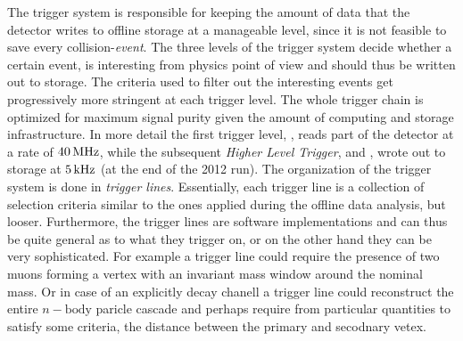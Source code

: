 
The trigger system is responsible for keeping the amount of data that the detector writes to offline storage
at a manageable level, since it is not feasible to save every collision-{\it event}. The three levels of
the \lhcb trigger system decide whether a certain event, is interesting from physics point
of view and should thus be written out to storage. The criteria used to filter out the interesting events 
get progressively more stringent at each trigger level. The whole trigger chain is optimized for maximum
signal purity given the amount of computing and storage infrastructure. In more detail the first trigger
level, \lzero, reads part of the detector at a rate of $40{\rm \,MHz}$, while the subsequent {\it Higher Level Trigger},
\hltone and \hlttwo, wrote out to storage at $5{\rm \,kHz}$ (at the end of the 2012 run). The organization of the trigger 
system is done in {\it trigger lines}. Essentially, each trigger line is a collection of selection criteria similar 
to the ones applied during the offline data analysis, but looser. Furthermore, the trigger lines are software
implementations and can thus be quite general as to what they trigger on, or on the other hand they can
be very sophisticated. For example a trigger line could require the presence of two muons forming a vertex 
with an invariant mass window around the nominal \jpsi mass. Or in case of an explicitly decay chanell a 
trigger line could reconstruct the entire $n-\text{body}$ paricle cascade and perhaps require from 
particular quantities to satisfy some criteria, \ie the distance between the primary and secodnary vetex.   

